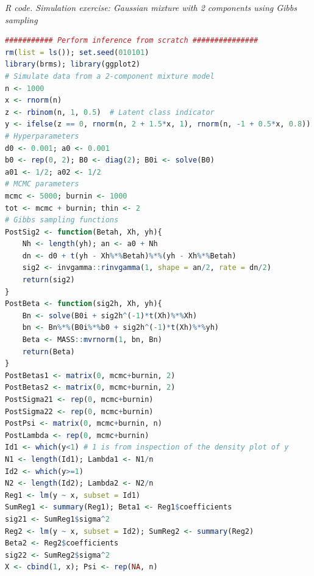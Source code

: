 \begin{tcolorbox}[enhanced,width=4.67in,center upper,
	fontupper=\large\bfseries,drop shadow southwest,sharp corners]
	\textit{R code. Simulation exercise: Gaussian mixture with 2 components using Gibbs sampling}
	\begin{VF}
		\begin{lstlisting}[language=R]
########### Perform inference from scratch ###############
rm(list = ls()); set.seed(010101)
library(brms); library(ggplot2)
# Simulate data from a 2-component mixture model
n <- 1000
x <- rnorm(n)
z <- rbinom(n, 1, 0.5)  # Latent class indicator
y <- ifelse(z == 0, rnorm(n, 2 + 1.5*x, 1), rnorm(n, -1 + 0.5*x, 0.8))
# Hyperparameters
d0 <- 0.001; a0 <- 0.001
b0 <- rep(0, 2); B0 <- diag(2); B0i <- solve(B0)
a01 <- 1/2; a02 <- 1/2
# MCMC parameters
mcmc <- 5000; burnin <- 1000
tot <- mcmc + burnin; thin <- 2
# Gibbs sampling functions
PostSig2 <- function(Betah, Xh, yh){
	Nh <- length(yh); an <- a0 + Nh
	dn <- d0 + t(yh - Xh%*%Betah)%*%(yh - Xh%*%Betah)
	sig2 <- invgamma::rinvgamma(1, shape = an/2, rate = dn/2)
	return(sig2)
}
PostBeta <- function(sig2h, Xh, yh){
	Bn <- solve(B0i + sig2h^(-1)*t(Xh)%*%Xh)
	bn <- Bn%*%(B0i%*%b0 + sig2h^(-1)*t(Xh)%*%yh)
	Beta <- MASS::mvrnorm(1, bn, Bn)
	return(Beta)
}
PostBetas1 <- matrix(0, mcmc+burnin, 2)
PostBetas2 <- matrix(0, mcmc+burnin, 2)
PostSigma21 <- rep(0, mcmc+burnin)
PostSigma22 <- rep(0, mcmc+burnin)
PostPsi <- matrix(0, mcmc+burnin, n)
PostLambda <- rep(0, mcmc+burnin)
Id1 <- which(y<1) # 1 is from inspection of the density plot of y 
N1 <- length(Id1); Lambda1 <- N1/n
Id2 <- which(y>=1)
N2 <- length(Id2); Lambda2 <- N2/n
Reg1 <- lm(y ~ x, subset = Id1)
SumReg1 <- summary(Reg1); Beta1 <- Reg1$coefficients
sig21 <- SumReg1$sigma^2 
Reg2 <- lm(y ~ x, subset = Id2); SumReg2 <- summary(Reg2)
Beta2 <- Reg2$coefficients
sig22 <- SumReg2$sigma^2
X <- cbind(1, x); Psi <- rep(NA, n)
\end{lstlisting}
	\end{VF}
\end{tcolorbox}
 
